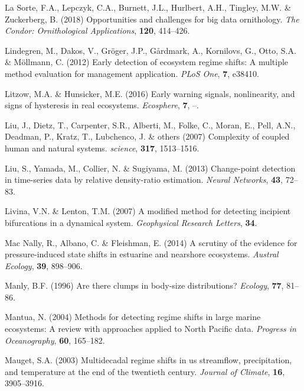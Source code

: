 \documentclass[12pt,twoside,openany]{reedthesis}
\begin{document}
\leavevmode\hypertarget{ref-lasorte2018opportunities}{}%
La Sorte, F.A., Lepczyk, C.A., Burnett, J.L., Hurlbert, A.H., Tingley, M.W. \& Zuckerberg, B. (2018) Opportunities and challenges for big data ornithology. \emph{The Condor: Ornithological Applications}, \textbf{120}, 414--426.

\leavevmode\hypertarget{ref-lindegren_early_2012}{}%
Lindegren, M., Dakos, V., Gröger, J.P., Gårdmark, A., Kornilovs, G., Otto, S.A. \& Möllmann, C. (2012) Early detection of ecosystem regime shifts: A multiple method evaluation for management application. \emph{PLoS One}, \textbf{7}, e38410.

\leavevmode\hypertarget{ref-litzow_early_2016}{}%
Litzow, M.A. \& Hunsicker, M.E. (2016) Early warning signals, nonlinearity, and signs of hysteresis in real ecosystems. \emph{Ecosphere}, \textbf{7}, --.

\leavevmode\hypertarget{ref-liu_complexity_2007}{}%
Liu, J., Dietz, T., Carpenter, S.R., Alberti, M., Folke, C., Moran, E., Pell, A.N., Deadman, P., Kratz, T., Lubchenco, J. \& others (2007) Complexity of coupled human and natural systems. \emph{science}, \textbf{317}, 1513--1516.

\leavevmode\hypertarget{ref-liu2013change}{}%
Liu, S., Yamada, M., Collier, N. \& Sugiyama, M. (2013) Change-point detection in time-series data by relative density-ratio estimation. \emph{Neural Networks}, \textbf{43}, 72--83.

\leavevmode\hypertarget{ref-livina2007modified}{}%
Livina, V.N. \& Lenton, T.M. (2007) A modified method for detecting incipient bifurcations in a dynamical system. \emph{Geophysical Research Letters}, \textbf{34}.

\leavevmode\hypertarget{ref-mac2014scrutiny}{}%
Mac Nally, R., Albano, C. \& Fleishman, E. (2014) A scrutiny of the evidence for pressure-induced state shifts in estuarine and nearshore ecosystems. \emph{Austral Ecology}, \textbf{39}, 898--906.

\leavevmode\hypertarget{ref-manly1996there}{}%
Manly, B.F. (1996) Are there clumps in body-size distributions? \emph{Ecology}, \textbf{77}, 81--86.

\leavevmode\hypertarget{ref-mantua_methods_2004}{}%
Mantua, N. (2004) Methods for detecting regime shifts in large marine ecosystems: A review with approaches applied to North Pacific data. \emph{Progress in Oceanography}, \textbf{60}, 165--182.

\leavevmode\hypertarget{ref-mauget2003multidecadal}{}%
Mauget, S.A. (2003) Multidecadal regime shifts in us streamflow, precipitation, and temperature at the end of the twentieth century. \emph{Journal of Climate}, \textbf{16}, 3905--3916.
\end{document}
